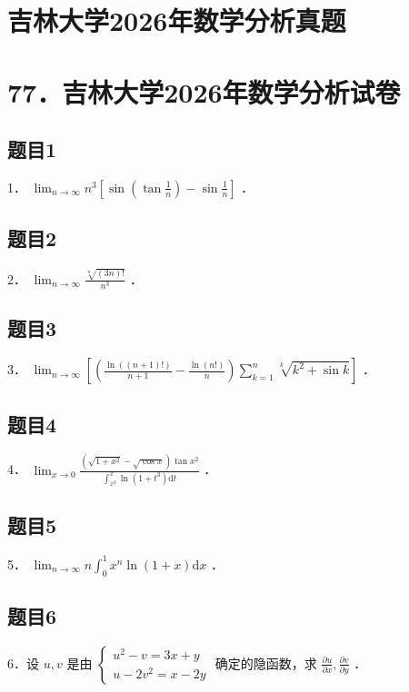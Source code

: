 \documentclass{article}
\begin{document}
\section*{吉林大学2026年数学分析真题}
\section*{77．吉林大学2026年数学分析试卷}

\subsection{题目1}
1． \(\lim _{n \rightarrow \infty} n^{3}\left[\sin \left(\tan \frac{1}{n}\right)-\sin \frac{1}{n}\right]\) ．

\subsection{题目2}
2． \(\lim _{n \rightarrow \infty} \frac{\sqrt[n]{(3 n)!}}{n^{3}}\) ．

\subsection{题目3}
3． \(\lim _{n \rightarrow \infty}\left[\left(\frac{\ln ((n+1)!)}{n+1}-\frac{\ln (n!)}{n}\right) \sum_{k=1}^{n} \sqrt[k]{k^{2}+\sin k}\right]\) ．

\subsection{题目4}
4． \(\lim _{x \rightarrow 0} \frac{\left(\sqrt{1+x^{2}}-\sqrt{\cos x}\right) \tan x^{2}}{\int_{x^{2}}^{x} \ln \left(1+t^{3}\right) \mathrm{d} t}\) ．

\subsection{题目5}
5． \(\lim _{n \rightarrow \infty} n \int_{0}^{1} x^{n} \ln (1+x) \mathrm{d} x\) ．

\subsection{题目6}
6．设 \(u, v\) 是由 \(\left\{\begin{array}{l}u^{2}-v=3 x+y \\ u-2 v^{2}=x-2 y\end{array}\right.\) 确定的隐函数，求 \(\frac{\partial u}{\partial x}, \frac{\partial v}{\partial y}\) ．
\end{document}
